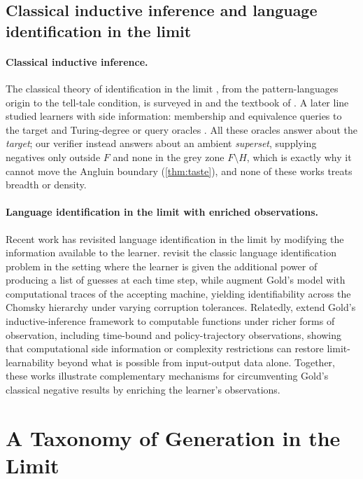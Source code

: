 \documentclass[11pt]{article}
\numberwithin{equation}{section}
\newcommand{\Amb}{F}
\newcommand{\Val}{H}
\theoremstyle{plain}
\theoremstyle{definition}
\theoremstyle{remark}
\begin{document}
\subsection{Classical inductive inference and language identification in the limit}
\paragraph{Classical inductive inference.}
The classical theory of identification in the limit
\citep{gold1967language,angluin1980inductive,angluin1979finding}, from the pattern-languages
origin to the tell-tale condition, is surveyed in
\citet{angluin1983inductive,lange2008learning} and the textbook of \citet{jain1999systems}. A
later line studied learners with side information: membership and equivalence queries to the
target \citep{angluin1987learning,angluin1988queries} and Turing-degree or query oracles
\citep{gasarch1989learning,stephan1998learning}. All these oracles answer about the
\emph{target}; our verifier instead answers about an ambient \emph{superset}, supplying
negatives only outside $\Amb$ and none in the grey zone $\Amb \setminus \Val$, which is
exactly why it cannot move the Angluin boundary (\cref{thm:taste}), and none of these works
treats breadth or density.

\paragraph{Language identification in the limit with enriched observations.} Recent work has revisited language identification in the limit by modifying the information available to the learner. \citet{cpt25} revisit the classic language identification problem in the setting where the learner is given the additional power of producing a list of guesses at each time step, while \citet{psv26} augment Gold's model with computational traces of the accepting machine, yielding identifiability across the Chomsky hierarchy under varying corruption tolerances. Relatedly, \citet{pf25} extend Gold's inductive-inference framework to computable functions under richer forms of observation, including time-bound and policy-trajectory observations, showing that computational side information or complexity restrictions can restore limit-learnability beyond what is possible from input-output data alone. Together, these works illustrate complementary mechanisms for circumventing Gold's classical negative results by enriching the learner's observations.

\section{A Taxonomy of Generation in the Limit}
\label{app:taxonomy}
\end{document}
